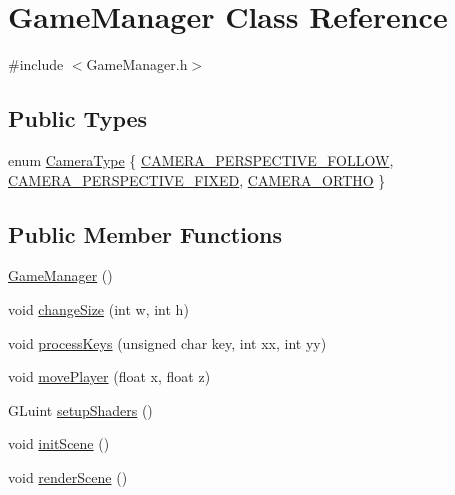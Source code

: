 \hypertarget{class_game_manager}{}\section{Game\+Manager Class Reference}
\label{class_game_manager}


{\ttfamily \#include $<$Game\+Manager.\+h$>$}

\subsection*{Public Types}
\begin{DoxyCompactItemize}
\item 
enum \hyperlink{class_game_manager_a3f3a18cdc6b3c7c7565927e895eea247}{Camera\+Type} \{ \hyperlink{class_game_manager_a3f3a18cdc6b3c7c7565927e895eea247a2e83b11bc593230f7f30214b50fd6cae}{C\+A\+M\+E\+R\+A\+\_\+\+P\+E\+R\+S\+P\+E\+C\+T\+I\+V\+E\+\_\+\+F\+O\+L\+L\+OW}, 
\hyperlink{class_game_manager_a3f3a18cdc6b3c7c7565927e895eea247a1bdebab59d48229c3066fa423ca789cc}{C\+A\+M\+E\+R\+A\+\_\+\+P\+E\+R\+S\+P\+E\+C\+T\+I\+V\+E\+\_\+\+F\+I\+X\+ED}, 
\hyperlink{class_game_manager_a3f3a18cdc6b3c7c7565927e895eea247a767d4e04d0898c8eb3f53a3b25be0194}{C\+A\+M\+E\+R\+A\+\_\+\+O\+R\+T\+HO}
 \}
\end{DoxyCompactItemize}
\subsection*{Public Member Functions}
\begin{DoxyCompactItemize}
\item 
\hyperlink{class_game_manager_aa0e2424dc1a39d380e5b6605b179bf05}{Game\+Manager} ()
\item 
void \hyperlink{class_game_manager_a7552e5b78753f1e78847ef1ac7bd0596}{change\+Size} (int w, int h)
\item 
void \hyperlink{class_game_manager_a1d22955ef38d38ee720432a0d56f33ae}{process\+Keys} (unsigned char key, int xx, int yy)
\item 
void \hyperlink{class_game_manager_ae51ce09e93fed12b8e45d6669c3975cd}{move\+Player} (float x, float z)
\item 
G\+Luint \hyperlink{class_game_manager_a88396466f77d0013a1bb085a6d19aad8}{setup\+Shaders} ()
\item 
void \hyperlink{class_game_manager_af98f6eb4ebe36b9405700cc95a6771be}{init\+Scene} ()
\item 
void \hyperlink{class_game_manager_aef819f3b139bc195db44a49299768eee}{render\+Scene} ()
\end{DoxyCompactItemize}
